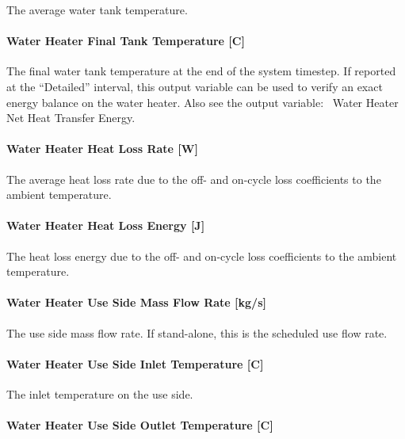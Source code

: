 The average water tank temperature.

\paragraph{Water Heater Final Tank Temperature {[}C{]}}\label{water-heater-final-tank-temperature-c}

The final water tank temperature at the end of the system timestep. If reported at the ``Detailed'' interval, this output variable can be used to verify an exact energy balance on the water heater. Also see the output variable:~ Water Heater Net Heat Transfer Energy.

\paragraph{Water Heater Heat Loss Rate {[}W{]}}\label{water-heater-heat-loss-rate-w}

The average heat loss rate due to the off- and on-cycle loss coefficients to the ambient temperature.

\paragraph{Water Heater Heat Loss Energy {[}J{]}}\label{water-heater-heat-loss-energy-j}

The heat loss energy due to the off- and on-cycle loss coefficients to the ambient temperature.

\paragraph{Water Heater Use Side Mass Flow Rate {[}kg/s{]}}\label{water-heater-use-side-mass-flow-rate-kgs}

The use side mass flow rate. If stand-alone, this is the scheduled use flow rate.

\paragraph{Water Heater Use Side Inlet Temperature {[}C{]}}\label{water-heater-use-side-inlet-temperature-c}

The inlet temperature on the use side.

\paragraph{Water Heater Use Side Outlet Temperature {[}C{]}}\label{water-heater-use-side-outlet-temperature-c}

